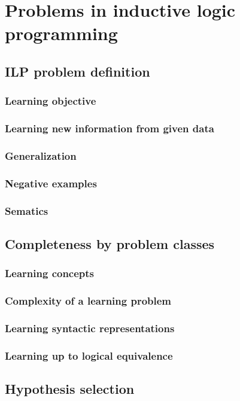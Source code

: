 \chapter{Problems in inductive logic programming}

\section{ILP problem definition}
\subsection{Learning objective}
\subsection{Learning new information from given data}
\subsection{Generalization}
\subsection{Negative examples}
\subsection{Sematics}

\section{Completeness by problem classes}
\subsection{Learning concepts}
\subsection{Complexity of a learning problem}
\subsection{Learning syntactic representations}
\subsection{Learning up to logical equivalence}
\section{Hypothesis selection}
